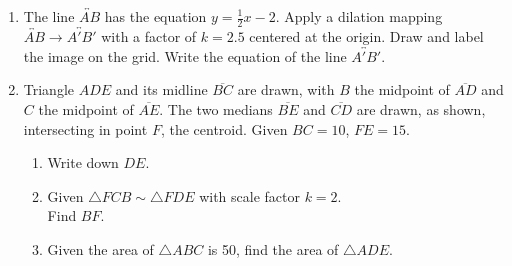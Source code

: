 \documentclass[12pt, twoside]{article}
\begin{document}
\begin{enumerate}
\newpage
\item The line $\overleftrightarrow{AB}$ has the equation $y=\frac{1}{2}x-2$. Apply a dilation mapping $\overleftrightarrow{AB} \rightarrow \overleftrightarrow{A'B'}$ with a factor of $k=2.5$ centered at the origin. Draw and label the image on the grid. Write the equation of the line $\overleftrightarrow{A'B'}$.
  \begin{flushright}
  \end{flushright} \vspace{1cm}

\item Triangle $ADE$ and its midline $\overline{BC}$ are drawn, with $B$ the midpoint of $\overline{AD}$ and $C$ the midpoint of $\overline{AE}$. The two medians $\overline{BE}$ and $\overline{CD}$ are drawn, as shown, intersecting in point $F$, the centroid. Given $BC=10$, $FE=15$.
\begin{multicols}{2}
\begin{enumerate}[itemsep=1.5cm]
    \item Write down $DE$.
    \item Given $\triangle FCB \sim \triangle FDE$ with scale factor $k=2$. \\[0.25cm]
    Find $BF$.
    \item Given the area of $\triangle ABC$ is 50, find the area of $\triangle ADE$.
\end{enumerate}
\begin{center}
\end{center}
\end{multicols}



\end{enumerate}
\end{document}
